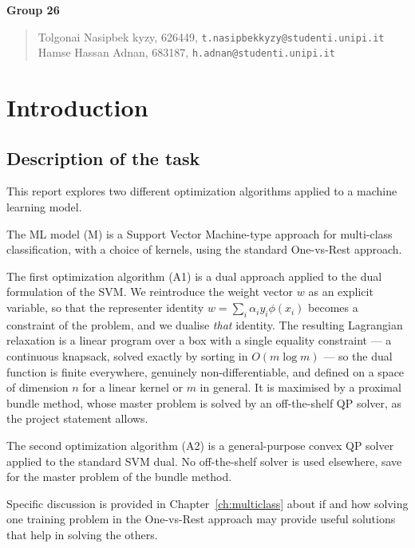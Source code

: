 \documentclass[11pt,a4paper]{report}
\begin{document}
\medskip
\noindent\textbf{Group 26}
\begin{quote}
Tolgonai Nasipbek kyzy, 626449, \texttt{t.nasipbekkyzy@studenti.unipi.it}\\
Hamse Hassan Adnan, 683187, \texttt{h.adnan@studenti.unipi.it}
\end{quote}
\clearpage

\tableofcontents

\chapter{Introduction}

\section{Description of the task}
This report explores two different optimization algorithms applied to a machine
learning model.

The ML model (M) is a Support Vector Machine-type approach for multi-class
classification, with a choice of kernels, using the standard One-vs-Rest approach.

The first optimization algorithm (A1) is a dual approach applied to the dual
formulation of the SVM. We reintroduce the weight vector $w$ as an explicit
variable, so that the representer identity $w=\sum_i\alpha_iy_i\phi(x_i)$ becomes a
constraint of the problem, and we dualise \emph{that} identity. The resulting
Lagrangian relaxation is a linear program over a box with a single equality
constraint --- a continuous knapsack, solved exactly by sorting in $O(m\log m)$ ---
so the dual function is finite everywhere, genuinely non-differentiable, and defined
on a space of dimension $n$ for a linear kernel or $m$ in general. It is maximised by
a proximal bundle method, whose master problem is solved by an off-the-shelf QP
solver, as the project statement allows.

The second optimization algorithm (A2) is a general-purpose convex QP solver applied
to the standard SVM dual. No off-the-shelf solver is used elsewhere, save for the
master problem of the bundle method.

Specific discussion is provided in Chapter~\ref{ch:multiclass} about if and how
solving one training problem in the One-vs-Rest approach may provide useful
solutions that help in solving the others.

\end{document}

